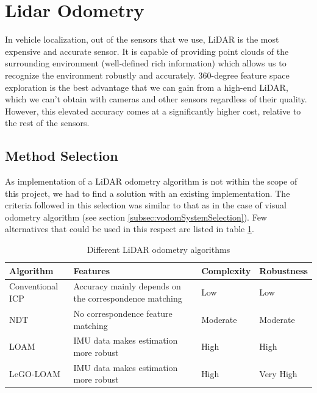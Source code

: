

\section{Lidar Odometry}
In vehicle localization, out of the sensors that we use, \gls{LiDAR} is the most expensive and accurate sensor. It is capable of providing point clouds of the surrounding environment (well-defined rich information) which allows us to recognize the environment robustly and accurately. 360-degree feature space exploration is the best advantage that we can gain from a high-end \gls{LiDAR}, which we can’t obtain with cameras and other sensors regardless of their quality. However, this elevated accuracy comes at a significantly higher cost, relative to the rest of the sensors.

\subsection{Method Selection}
As implementation of a \gls{LiDAR} odometry algorithm is not within the scope of this project, we had to find a solution with an existing implementation. The criteria followed in this selection was similar to that as in the case of visual odometry algorithm (see section \ref{subsec:vodomSystemSelection}). Few alternatives that could be used in this respect are listed in table \ref{table:ha:DifferentLOdomMethods}.
\begin{table}[h]
	\centering
	\begin{tabular}{|p{}|p{}|p{}|p{}|} 
		\hline
		\textbf{Algorithm} & \textbf{Features} & \textbf{Complexity} & \textbf{Robustness} \\
		\hline
		Conventional \gls{ICP}&Accuracy mainly depends on the correspondence
		matching&Low&Low\\
		\hline
		\gls{NDT}&No correspondence feature matching&Moderate&Moderate\\
		\hline
		\gls{LOAM}&IMU data makes estimation more robust& High & High\\
		\hline
		\gls{LeGO-LOAM}&IMU data makes estimation more robust& High & Very High\\
		\hline
	\end{tabular}
	\caption{Different \gls{LiDAR} odometry algorithms}
	\label{table:ha:DifferentLOdomMethods}
	\vspace{0.5cm}
\end{table}


